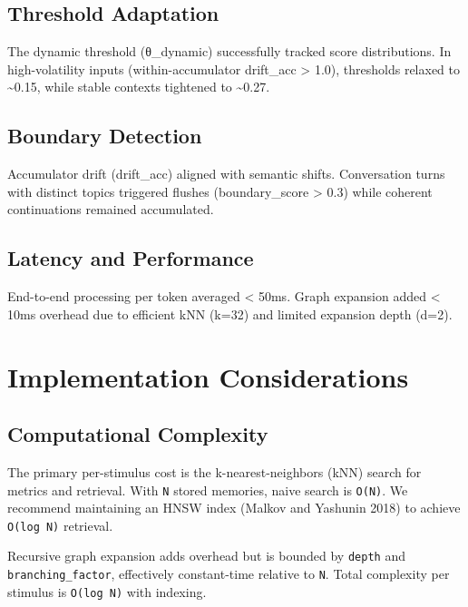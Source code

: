 \documentclass[
  letterpaper,
  DIV=11,
  numbers=noendperiod]{scrartcl}
\begin{document}
\subsection{Threshold Adaptation}\label{threshold-adaptation}

The dynamic threshold (θ\_dynamic) successfully tracked score
distributions. In high-volatility inputs (within-accumulator drift\_acc
\textgreater{} 1.0), thresholds relaxed to \textasciitilde0.15, while
stable contexts tightened to \textasciitilde0.27.

\subsection{Boundary Detection}\label{boundary-detection}

Accumulator drift (drift\_acc) aligned with semantic shifts.
Conversation turns with distinct topics triggered flushes
(boundary\_score \textgreater{} 0.3) while coherent continuations
remained accumulated.

\subsection{Latency and Performance}\label{latency-and-performance}

End-to-end processing per token averaged \textless{} 50ms. Graph
expansion added \textless{} 10ms overhead due to efficient kNN (k=32)
and limited expansion depth (d=2).

\section{Implementation Considerations}\label{sec-implementation}

\subsection{Computational Complexity}\label{computational-complexity}

The primary per-stimulus cost is the k-nearest-neighbors (kNN) search
for metrics and retrieval. With \texttt{N} stored memories, naive search
is \texttt{O(N)}. We recommend maintaining an HNSW index (Malkov and
Yashunin 2018) to achieve \texttt{O(log\ N)} retrieval.

Recursive graph expansion adds overhead but is bounded by \texttt{depth}
and \texttt{branching\_factor}, effectively constant-time relative to
\texttt{N}. Total complexity per stimulus is \texttt{O(log\ N)} with
indexing.
\end{document}
